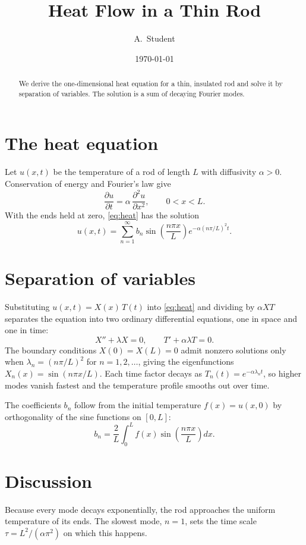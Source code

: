 \documentclass[11pt]{article}
\title{Heat Flow in a Thin Rod}
\author{A.~Student}
\date{\today}
\begin{document}
\maketitle

\begin{abstract}
We derive the one-dimensional heat equation
for a thin, insulated rod and solve it by
separation of variables. The solution is a
sum of decaying Fourier modes.
\end{abstract}

\section{The heat equation}
Let $u(x,t)$ be the temperature of a rod of
length $L$ with diffusivity $\alpha > 0$.
Conservation of energy and Fourier's law give
\begin{equation}
  \frac{\partial u}{\partial t}
    = \alpha \, \frac{\partial^2 u}{\partial x^2},
  \qquad 0 < x < L.
  \label{eq:heat}
\end{equation}
With the ends held at zero, \eqref{eq:heat} has the solution
\begin{equation}
  u(x,t) = \sum_{n=1}^{\infty} b_n
    \sin\!\left(\frac{n\pi x}{L}\right)
    e^{-\alpha (n\pi/L)^2 t}.
\end{equation}

\section{Separation of variables}
Substituting $u(x,t) = X(x)\,T(t)$ into \eqref{eq:heat} and dividing
by $\alpha X T$ separates the equation into two ordinary differential
equations, one in space and one in time:
\begin{equation}
  X'' + \lambda X = 0, \qquad T' + \alpha \lambda T = 0.
\end{equation}
The boundary conditions $X(0) = X(L) = 0$ admit nonzero solutions only
when $\lambda_n = (n\pi/L)^2$ for $n = 1, 2, \dots$, giving the
eigenfunctions $X_n(x) = \sin(n\pi x / L)$. Each time factor decays as
$T_n(t) = e^{-\alpha \lambda_n t}$, so higher modes vanish fastest and
the temperature profile smooths out over time.

The coefficients $b_n$ follow from the initial temperature $f(x) = u(x,0)$
by orthogonality of the sine functions on $[0, L]$:
\begin{equation}
  b_n = \frac{2}{L} \int_0^L f(x) \sin\!\left(\frac{n\pi x}{L}\right) dx.
\end{equation}

\section{Discussion}
Because every mode decays exponentially, the rod approaches the uniform
temperature of its ends. The slowest mode, $n = 1$, sets the time scale
$\tau = L^2 / (\alpha \pi^2)$ on which this happens.
\end{document}
